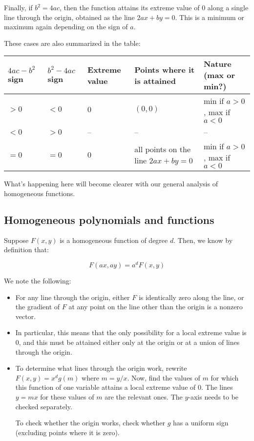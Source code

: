 \documentclass[10pt]{amsart}
\begin{document}
Finally, if $b^2 = 4ac$, then the function attains its extreme value of $0$
along a single line through the origin, obtained as the line $2ax + by
= 0$. This is a minimum or maximum again depending on the sign of $a$.

These cases are also summarized in the table:

\begin{tabular}{|l|l|l|l|l|}
  \hline
  $4ac - b^2$ sign & $b^2 - 4ac$ sign & Extreme value & Points where it is attained & Nature (max or min?)\\
  \hline
  $> 0$ & $< 0$ & $0$ & $(0,0)$ & min if $a > 0$, max if $a < 0$ \\
  \hline
  $< 0$ & $> 0$ & -- & -- & --\\
  \hline
  $= 0$ & $= 0$ & $0$ & all points on the line $2ax + by = 0$ & min if $a > 0$, max if $a < 0$\\
  \hline
\end{tabular}

What's happening here will become clearer with our general analysis of
homogeneous functions.

\subsection{Homogeneous polynomials and functions}

Suppose $F(x,y)$ is a homogeneous function of degree $d$. Then, we
know by definition that:

$$F(ax,ay) = a^dF(x,y)$$

We note the following:

\begin{itemize}
\item For any line through the origin, either $F$ is identically zero
  along the line, or the gradient of $F$ at any point on the line
  other than the origin is a nonzero vector.
\item In particular, this means that the only possibility for a local
  extreme value is $0$, and this must be attained either only at the
  origin or at a union of lines through the origin.
\item To determine what lines through the origin work, rewrite $F(x,y)
  = x^dg(m)$ where $m = y/x$. Now, find the values of $m$ for which
  this function of one variable attains a local extreme value
  of $0$. The lines $y = mx$ for these values of $m$ are the relevant
  ones. The $y$-axis needs to be checked separately.

  To check whether the origin works, check whether $g$ has a uniform
  sign (excluding points where it is zero).
\end{itemize}
\end{document}
